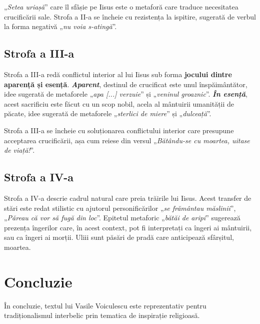 \documentclass{article}
\newcommand{\qu}[1]{„\emph{#1}”}
\begin{document}
\qu{Setea uriașă} care îl sfâșie pe Iisus este o metaforă care traduce necesitatea crucificării sale. Strofa a II-a se încheie cu rezistența la ispitire, sugerată de verbul la forma negativă \qu{nu voia s-atingă}.

\subsection{Strofa a III-a}
Strofa a III-a redă conflictul interior al lui Iisus sub forma \textbf{jocului dintre aparență și esență}. \textsl{\textbf{Aparent}}, destinul de crucificat este unul înspăimântător, idee sugerată de metaforele \qu{apa [...] verzuie} și \qu{veninul groaznic}. \textsl{\textbf{În esență}}, acest sacrificiu este făcut cu un scop nobil, acela al mântuirii umanității de păcate, idee sugerată de metaforele \qu{sterlici de miere} și \qu{dulceață}.

Strofa a III-a se încheie cu soluționarea conflictului interior care presupune acceptarea crucificării, așa cum reiese din versul \qu{Bătându-se cu moartea, uitase de viață!}.

\subsection{Strofa a IV-a}
Strofa a IV-a descrie cadrul natural care preia trăirile lui Iisus. Acest transfer de stări este redat stilistic cu ajutorul personificărilor \qu{se frământau măslinii}, \qu{Păreau că vor să fugă din loc}. Epitetul metaforic \qu{bătăi de aripi} sugerează prezența îngerilor care, în acest context, pot fi interpretați ca îngeri ai mântuirii, sau ca îngeri ai morții. Uliii sunt păsări de pradă care anticipează sfârșitul, moartea.

\section{Concluzie}
În concluzie, textul lui Vasile Voiculescu este reprezentativ pentru tradiționalismul interbelic prin tematica de inspirație religioasă.
\end{document}
